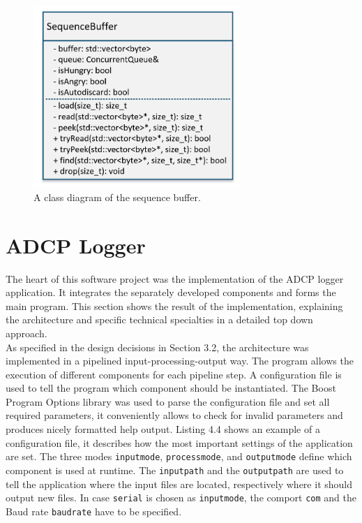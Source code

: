 \begin{figure}[ht]
\centering
      \includegraphics[width=0.7\textwidth]{seqbuf}
        \caption{A class diagram of the sequence buffer.}
\end{figure}

\section{ADCP Logger}
The heart of this software project was the implementation of the ADCP logger application. It integrates the separately developed components and forms the main program. This section shows the result of the implementation, explaining the architecture and specific technical specialties in a detailed top down approach.\\
As specified in the design decisions in Section 3.2, the architecture was implemented in a pipelined input-processing-output way. The program allows the execution of different components for each pipeline step. A configuration file is used to tell the program which component should be instantiated. The Boost Program Options library was used to parse the configuration file and set all required parameters, it conveniently allows to check for invalid parameters and produces nicely formatted help output. Listing 4.4 shows an example of a configuration file, it describes how the most important settings of the application are set. The three modes \texttt{inputmode}, \texttt{processmode}, and \texttt{outputmode} define which component is used at runtime. The \texttt{inputpath} and the \texttt{outputpath} are used to tell the application where the input files are located, respectively where it should output new files. In case \texttt{serial} is chosen as \texttt{inputmode}, the comport \texttt{com} and the Baud rate \texttt{baudrate} have to be specified. 

